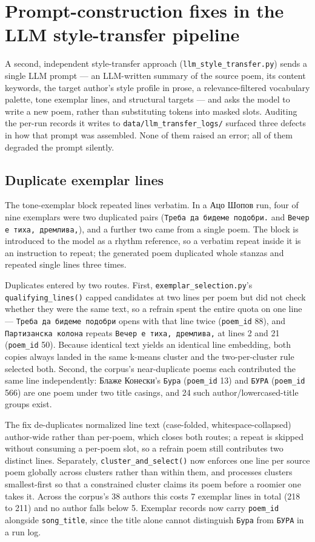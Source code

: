 \documentclass[11pt]{article}
\begin{document}
\section{Prompt-construction fixes in the LLM style-transfer
  pipeline}\label{sec:llmprompt}

A second, independent style-transfer approach (\texttt{llm\_style\_transfer.py})
sends a single LLM prompt — an LLM-written summary of the source poem, its
content keywords, the target author's style profile in prose, a
relevance-filtered vocabulary palette, tone exemplar lines, and structural
targets — and asks the model to write a new poem, rather than substituting
tokens into masked slots. Auditing the per-run records it writes to
\texttt{data/llm\_transfer\_logs/} surfaced three defects in how that prompt
was assembled. None of them raised an error; all of them degraded the prompt
silently.

\subsection{Duplicate exemplar lines}

The tone-exemplar block repeated lines verbatim. In a Ацо Шопов run, four of
nine exemplars were two duplicated pairs (\texttt{Треба да бидеме подобри.}
and \texttt{Вечер е тиха, дремлива,}), and a further two came from a single
poem. The block is introduced to the model as a rhythm reference, so a
verbatim repeat inside it is an instruction to repeat; the generated poem
duplicated whole stanzas and repeated single lines three times.

Duplicates entered by two routes. First, \texttt{exemplar\_selection.py}'s
\texttt{qualifying\_lines()} capped candidates at two lines per poem but did
not check whether they were the same text, so a refrain spent the entire
quota on one line — \texttt{Треба да бидеме подобри} opens with that line
twice (\texttt{poem\_id} 88), and \texttt{Партизанска колона} repeats
\texttt{Вечер е тиха, дремлива,} at lines 2 and 21 (\texttt{poem\_id} 50).
Because identical text yields an identical line embedding, both copies always
landed in the same k-means cluster and the two-per-cluster rule selected both.
Second, the corpus's near-duplicate poems each contributed the same line
independently: Блаже Конески's \texttt{Бура} (\texttt{poem\_id} 13) and
\texttt{БУРА} (\texttt{poem\_id} 566) are one poem under two title casings,
and 24 such author/lowercased-title groups exist.

The fix de-duplicates normalized line text (case-folded, whitespace-collapsed)
author-wide rather than per-poem, which closes both routes; a repeat is
skipped without consuming a per-poem slot, so a refrain poem still contributes
two distinct lines. Separately, \texttt{cluster\_and\_select()} now enforces
one line per source poem globally across clusters rather than within them,
and processes clusters smallest-first so that a constrained cluster claims its
poem before a roomier one takes it. Across the corpus's 38 authors this costs
7 exemplar lines in total (218 to 211) and no author falls below 5. Exemplar
records now carry \texttt{poem\_id} alongside \texttt{song\_title}, since the
title alone cannot distinguish \texttt{Бура} from \texttt{БУРА} in a run log.
\end{document}
